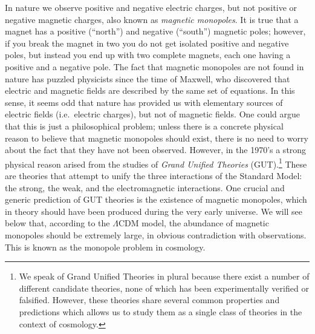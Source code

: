 In nature we observe positive and negative electric charges, but not positive or negative magnetic charges, also known as {\it magnetic monopoles}. It is true that a magnet has a positive (``north'') and negative (``south'') magnetic poles; however, if you break the magnet in two you do not get isolated positive and negative poles, but instead you end up with two complete magnets, each one having a positive and a negative pole. The fact that magnetic monopoles are not found in nature has puzzled physicists since the time of Maxwell, who discovered that electric and magnetic fields are described by the same set of equations. In this sense, it seems odd that nature has provided us with elementary sources of electric fields (i.e.\ electric charges), but not of magnetic fields. One could argue that this is just a philosophical problem; unless there is a concrete physical reason to believe that magnetic monopoles should exist, there is no need to worry about the fact that they have not been observed. However, in the 1970's a strong physical reason arised from the studies of {\it Grand Unified Theories} (GUT).\footnote{We speak of Grand Unified Theories in plural because there exist a number of different candidate theories, none of which has been experimentally verified or falsified. However, these theories share several common properties and predictions which allows us to study them as a single class of theories in the context of cosmology.} These are theories that attempt to unify the three interactions of the Standard Model: the strong, the weak, and the electromagnetic interactions. One crucial and generic prediction of GUT theories is the existence of magnetic monopoles, which in theory should have been produced during the very early universe. We will see below that, according to the $\Lambda$CDM model, the abundance of magnetic monopoles should be extremely large, in obvious contradiction with observations. This is known as the monopole problem in cosmology.

